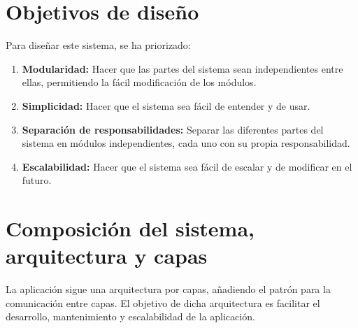 \documentclass[a4paper,12pt]{article}
\begin{document}
    \section{Objetivos de diseño}\label{sec:objetivos-de-diseno}
    Para diseñar este sistema, se ha priorizado:
    \begin{enumerate}
        \item \textbf{Modularidad:} Hacer que las partes del sistema sean independientes entre ellas, permitiendo la fácil modificación de los módulos.
        \item \textbf{Simplicidad:} Hacer que el sistema sea fácil de entender y de usar.
        \item \textbf{Separación de responsabilidades:} Separar las diferentes partes del sistema en módulos independientes, cada uno con su propia responsabilidad.
        \item \textbf{Escalabilidad:} Hacer que el sistema sea fácil de escalar y de modificar en el futuro.
    \end{enumerate}


    \section{Composición del sistema, arquitectura y capas}\label{sec:composicion-del-sistema-arquitectura-y-capas}
    La aplicación sigue una arquitectura por capas, añadiendo el patrón  para la comunicación entre capas.
    El objetivo de dicha arquitectura es facilitar el desarrollo, mantenimiento y escalabilidad de la aplicación.
\end{document}
